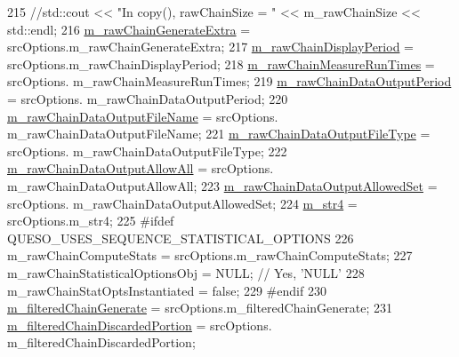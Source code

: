\begin{DoxyCode}
215 \textcolor{comment}{//std::cout << "In copy(), rawChainSize = " << m\_rawChainSize << std::endl;}
216   \hyperlink{class_q_u_e_s_o_1_1_m_l_sampling_level_options_ab0dda87d92a759b277d07157def23174}{m\_rawChainGenerateExtra}                     = srcOptions.m\_rawChainGenerateExtra;
217   \hyperlink{class_q_u_e_s_o_1_1_m_l_sampling_level_options_a6d0e080a6b428a8e6c8fed14c597c883}{m\_rawChainDisplayPeriod}                     = srcOptions.m\_rawChainDisplayPeriod;
218   \hyperlink{class_q_u_e_s_o_1_1_m_l_sampling_level_options_ad93ee62195c418eedb55877009102cab}{m\_rawChainMeasureRunTimes}                   = srcOptions.
      m\_rawChainMeasureRunTimes;
219   \hyperlink{class_q_u_e_s_o_1_1_m_l_sampling_level_options_a8fdb68e6d3e91f0334293f2ee009aded}{m\_rawChainDataOutputPeriod}                  = srcOptions.
      m\_rawChainDataOutputPeriod;
220   \hyperlink{class_q_u_e_s_o_1_1_m_l_sampling_level_options_ab89d7ed301a956f913058a8e5f63fbbd}{m\_rawChainDataOutputFileName}                = srcOptions.
      m\_rawChainDataOutputFileName;
221   \hyperlink{class_q_u_e_s_o_1_1_m_l_sampling_level_options_a239091edd94cfa694c6c33591c1d1ba2}{m\_rawChainDataOutputFileType}                = srcOptions.
      m\_rawChainDataOutputFileType;
222   \hyperlink{class_q_u_e_s_o_1_1_m_l_sampling_level_options_a4e84fdd26bf87099d2b126f5fda379a6}{m\_rawChainDataOutputAllowAll}                = srcOptions.
      m\_rawChainDataOutputAllowAll;
223   \hyperlink{class_q_u_e_s_o_1_1_m_l_sampling_level_options_ae5c2fe5b90eda78e17ccfbf3dbcfcc89}{m\_rawChainDataOutputAllowedSet}              = srcOptions.
      m\_rawChainDataOutputAllowedSet;
224   \hyperlink{class_q_u_e_s_o_1_1_m_l_sampling_level_options_a399d93049d7862d47c8ac68e1885d0c9}{m\_str4}                                      = srcOptions.m\_str4;
225 \textcolor{preprocessor}{#ifdef QUESO\_USES\_SEQUENCE\_STATISTICAL\_OPTIONS}
226 \textcolor{preprocessor}{}  m\_rawChainComputeStats                      = srcOptions.m\_rawChainComputeStats;
227   m\_rawChainStatisticalOptionsObj             = NULL; \textcolor{comment}{// Yes, 'NULL'}
228   m\_rawChainStatOptsInstantiated              = \textcolor{keyword}{false};
229 \textcolor{preprocessor}{#endif}
230 \textcolor{preprocessor}{}  \hyperlink{class_q_u_e_s_o_1_1_m_l_sampling_level_options_a878542ef3504c843b50e0bd5efd0c078}{m\_filteredChainGenerate}                     = srcOptions.m\_filteredChainGenerate;
231   \hyperlink{class_q_u_e_s_o_1_1_m_l_sampling_level_options_a22220cb7fbdef58a009733f8cf1887f9}{m\_filteredChainDiscardedPortion}             = srcOptions.
      m\_filteredChainDiscardedPortion;

\end{DoxyCode}
